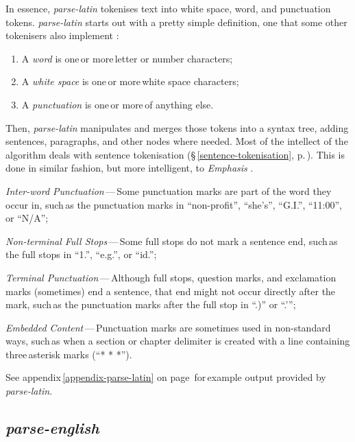 In essence, \emph{parse-latin} tokenises text into white space, word, and
  punctuation tokens.
\emph{parse-latin} starts out with a pretty simple definition, one that
  some other tokenisers also implement \autocite{treebank-tokenisation}:

\begin{enumerate}
\item A \emph{word} is one\,or more\,letter or number characters;
\item A \emph{white space} is one\,or more\,white space characters;
\item A \emph{punctuation} is one\,or more\,of anything else.
\end{enumerate}

\noindent Then, \emph{parse-latin} manipulates and merges those tokens into a
  syntax tree, adding sentences, paragraphs, and other nodes where needed.
Most of the intellect of the algorithm deals with sentence tokenisation
  (§\,\ref{sentence-tokenisation}, p.\,\pageref{sentence-tokenisation}).
This is done in similar fashion, but more intelligent, to \emph{Emphasis}
  \autocite{nytimes/emphasis-source-code}.

\begin{aenumerate}
\item\emph{Inter-word Punctuation}\,---\,Some punctuation marks are part of
  the word they occur in, such\,as the punctuation marks in ``non-profit'',
  ``she's'', ``G.I.'', ``11:00'', or ``N\slash A'';
\item\emph{Non-terminal Full Stops}\,---\,Some full stops do not mark a
  sentence end, such\,as the full stops in ``1.'', ``e.g.'', or ``id.'';
\item\emph{Terminal Punctuation}\,---\,Although full stops, question marks,
  and exclamation marks (sometimes) end a sentence, that end might not occur
  directly after the mark, such\,as the punctuation marks after the full
  stop in ``.)'' or ``.'{}'';
\item\emph{Embedded Content}\,---\,Punctuation marks are sometimes used in
  non-standard ways, such\,as when a section or chapter delimiter is
  created with a line containing three\,asterisk marks (``* * *'').
\end{aenumerate}

\noindent See appendix\,\ref{appendix-parse-latin} on
page\,\pageref{appendix-parse-latin} for\,example output provided
by \emph{parse-latin}.

\subsection{\emph{parse-english}}\label{parse-english}

